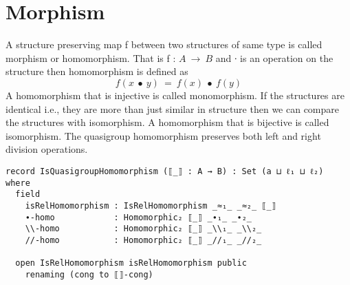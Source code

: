 \section{Morphism}
A structure preserving map f between two structures of same type is called
morphism or homomorphism. That is f : \(A \ \rightarrow \  B\) and ∙ is an operation
on the structure then homomorphism is defined as \[f(x\  ∙ \  y) \ = \ f(x) \ ∙ \  f(y)\] A
homomorphism that is injective is called monomorphism. If the structures are
identical i.e., they are more than just similar in structure then we can
compare the structures with isomorphism. A homomorphism that is bijective is
called isomorphism. The quasigroup homomorphism preserves both left and right
division operations.
\begin{comment}
module QuasigroupMorphisms (Q\textsubscript{1} : RawQuasigroup a ℓ\textsubscript{1}) (Q\textsubscript{2} : RawQuasigroup b ℓ\textsubscript{2}) where

  open RawQuasigroup Q\textsubscript{1} renaming (Carrier to A; ∙-rawMagma to ∙-rawMagma\textsubscript{1};
                                  \textbackslash\textbackslash-rawMagma to \textbackslash\textbackslash-rawMagma\textsubscript{1}; //-rawMagma to //-rawMagma\textsubscript{1};
                                  _≈_ to _≈\textsubscript{1}_; _∙_ to _∙\textsubscript{1}_; _\textbackslash\textbackslash_ to _\textbackslash\textbackslash\textsubscript{1}_; _//_ to _//\textsubscript{1}_)
  open RawQuasigroup Q\textsubscript{2} renaming (Carrier to B; ∙-rawMagma to ∙-rawMagma\textsubscript{2};
                                  \textbackslash\textbackslash-rawMagma to \textbackslash\textbackslash-rawMagma\textsubscript{2}; //-rawMagma to //-rawMagma\textsubscript{2};
                                  _≈_ to _≈\textsubscript{2}_; _∙_ to _∙\textsubscript{2}_; _\textbackslash\textbackslash_ to _\textbackslash\textbackslash\textsubscript{2}_; _//_ to _//\textsubscript{2}_)

  module ∙  = MagmaMorphisms ∙-rawMagma\textsubscript{1} ∙-rawMagma\textsubscript{2}
  module \textbackslash\textbackslash = MagmaMorphisms \textbackslash\textbackslash-rawMagma\textsubscript{1} \textbackslash\textbackslash-rawMagma\textsubscript{2}
  module // = MagmaMorphisms //-rawMagma\textsubscript{1} //-rawMagma\textsubscript{2}

  open MorphismDefinitions A B _≈\textsubscript{2}_
  open FunctionDefinitions _≈\textsubscript{1}_ _≈\textsubscript{2}_
\end{comment}
\begin{verbatim}
record IsQuasigroupHomomorphism (⟦_⟧ : A → B) : Set (a ⊔ ℓ₁ ⊔ ℓ₂) where
  field
    isRelHomomorphism : IsRelHomomorphism _≈₁_ _≈₂_ ⟦_⟧
    ∙-homo            : Homomorphic₂ ⟦_⟧ _∙₁_ _∙₂_
    \\-homo           : Homomorphic₂ ⟦_⟧ _\\₁_ _\\₂_
    //-homo           : Homomorphic₂ ⟦_⟧ _//₁_ _//₂_

  open IsRelHomomorphism isRelHomomorphism public
    renaming (cong to ⟦⟧-cong)
\end{verbatim}
